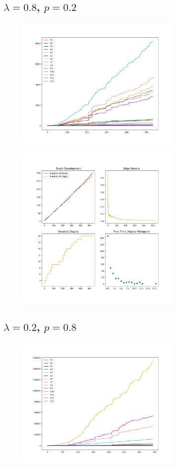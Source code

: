 \FloatBarrier

\subsection*{$\lambda=0.8$, $p=0.2$}

\begin{figure}[h!]
    \includegraphics[width=8cm]{Images/twitter_sim_for_stats_3_0.8_0.2.png}
    \centering
\end{figure}

\begin{figure}[h!]
    \includegraphics[width=8cm]{Images/twitter_sim_stats_3_0.8_0.2.png}
    \centering
\end{figure}

\FloatBarrier

\subsection*{$\lambda=0.2$, $p=0.8$}

\begin{figure}[h!]
    \includegraphics[width=8cm]{Images/twitter_sim_for_stats_3_0.2_0.8.png}
    \centering
\end{figure}


